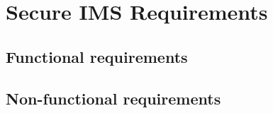 
\chapter{Secure IMS Requirements}\label{ch:build-secure-ims}


\section{Functional requirements}\label{sec:functional-requirements}


\section{Non-functional requirements}\label{sec:non-functional-requirements}